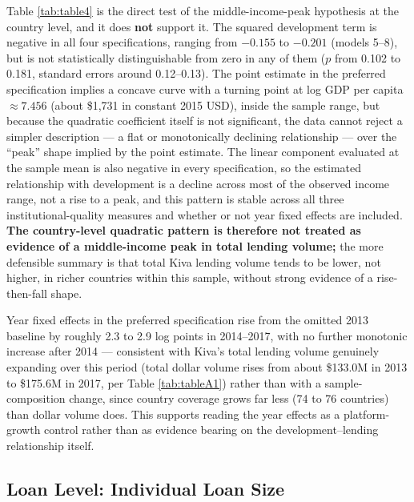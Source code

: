 \documentclass[12pt]{article}
\begin{document}


Table \ref{tab:table4} is the direct test of the middle-income-peak hypothesis at the country level,
and it does \textbf{not} support it. The squared development term is negative in all four
specifications, ranging from $-0.155$ to $-0.201$ (models 5--8), but is not statistically
distinguishable from zero in any of them ($p$ from 0.102 to 0.181, standard errors around 0.12--0.13).
The point estimate in the preferred specification implies a concave curve with a turning point at log
GDP per capita $\approx 7.456$ (about \$1,731 in constant 2015 USD), inside the sample range, but
because the quadratic coefficient itself is not significant, the data cannot reject a simpler
description --- a flat or monotonically declining relationship --- over the ``peak'' shape implied by
the point estimate. The linear component evaluated at the sample mean is also negative in every
specification, so the estimated relationship with development is a decline across most of the observed
income range, not a rise to a peak, and this pattern is stable across all three institutional-quality
measures and whether or not year fixed effects are included. \textbf{The country-level quadratic
pattern is therefore not treated as evidence of a middle-income peak in total lending volume;} the
more defensible summary is that total Kiva lending volume tends to be lower, not higher, in richer
countries within this sample, without strong evidence of a rise-then-fall shape.





Year fixed effects in the preferred specification rise from the omitted 2013 baseline by roughly 2.3
to 2.9 log points in 2014--2017, with no further monotonic increase after 2014 --- consistent with
Kiva's total lending volume genuinely expanding over this period (total dollar volume rises from about
\$133.0M in 2013 to \$175.6M in 2017, per Table \ref{tab:tableA1}) rather than with a
sample-composition change, since country coverage grows far less (74 to 76 countries) than dollar
volume does. This supports reading the year effects as a platform-growth control rather than as
evidence bearing on the development--lending relationship itself.

\subsection{Loan Level: Individual Loan Size}
\label{sec:results-loan}
\end{document}
